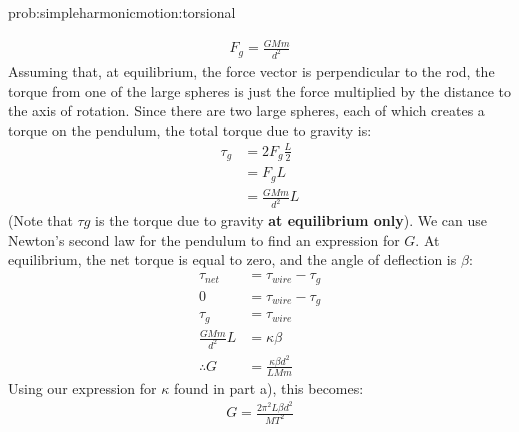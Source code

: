 \begin{solution}{prob:simpleharmonicmotion:torsional}
\begin{enumerate}[(a)]
\begin{align*}
F_g=\frac{GMm}{d^2}
\end{align*}
Assuming that, at equilibrium, the force vector is perpendicular to the rod, the torque from one of the large spheres is just the force multiplied by the distance to the axis of rotation. Since there are two large spheres, each of which creates a torque on the pendulum, the total torque due to gravity is: 
\begin{align*}
\tau_g&=2F_g\frac{L}{2}\\
&=F_gL\\
&=\frac{GMm}{d^2}L
\end{align*}
(Note that $\tau g$ is the torque due to gravity \textbf{at equilibrium only}). We can use Newton's second law for the pendulum to find an expression for $G$. At equilibrium, the net torque is equal to zero, and the angle of deflection is $\beta$:
\begin{align*}
\tau_{net}&=\tau_{wire}-\tau_g\\
0&=\tau_{wire}-\tau_g\\
\tau_g&=\tau_{wire}\\
\frac{GMm}{d^2}L&=\kappa\beta\\
\therefore G&=\frac{\kappa\beta d^2}{LMm}
\end{align*}
Using our expression for $\kappa$ found in part a), this becomes:
\begin{align*}
G=\frac{2\pi^2L\beta d^2}{MT^2}
\end{align*}
\end{enumerate}
\end{solution}



